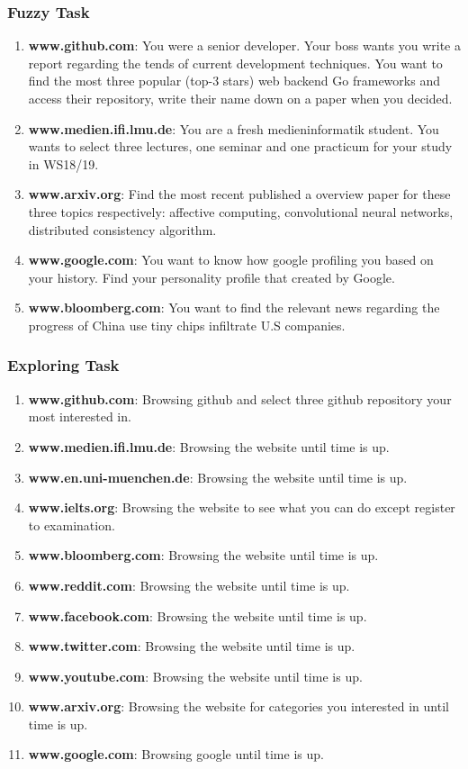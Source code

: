 \subsubsection{Fuzzy Task}

\begin{enumerate}
\item \textbf{www.github.com}: You were a senior developer. Your boss wants you write a report regarding the tends of current development techniques. You want to find the most three popular (top-3 stars) web backend Go frameworks and access their repository,  write their name down on a paper when you decided.
\item \textbf{www.medien.ifi.lmu.de}: You are a fresh medieninformatik student. You wants to select three lectures, one seminar and one practicum for your study in WS18/19.
\item \textbf{www.arxiv.org}: Find the most recent published a overview paper for these three topics respectively: affective computing, convolutional neural networks, distributed consistency algorithm.
\item \textbf{www.google.com}: You want to know how google profiling you based on your history. Find your personality profile that created by Google.
\item \textbf{www.bloomberg.com}: You want to find the relevant news regarding the progress of China use tiny chips infiltrate U.S companies.
\end{enumerate}

\subsubsection{Exploring Task}

\begin{enumerate}
\item \textbf{www.github.com}: Browsing github and select three github repository your most interested in.
\item \textbf{www.medien.ifi.lmu.de}: Browsing the website until time is up.
\item \textbf{www.en.uni-muenchen.de}: Browsing the website until time is up.
\item \textbf{www.ielts.org}: Browsing the website to see what you can do except register to examination.
\item \textbf{www.bloomberg.com}:  Browsing the website until time is up.
\item \textbf{www.reddit.com}:  Browsing the website until time is up.
\item \textbf{www.facebook.com}:  Browsing the website until time is up.
\item \textbf{www.twitter.com}:  Browsing the website until time is up.
\item \textbf{www.youtube.com}:  Browsing the website until time is up.
\item \textbf{www.arxiv.org}: Browsing the website for categories you interested in until time is up.
\item \textbf{www.google.com}: Browsing google until time is up.
\end{enumerate}

